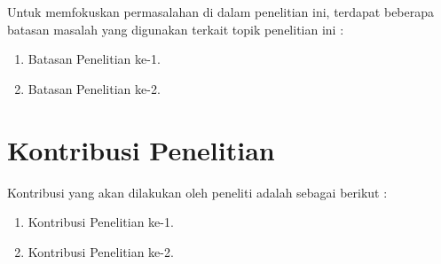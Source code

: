 Untuk memfokuskan permasalahan di dalam penelitian ini, terdapat beberapa batasan masalah yang digunakan terkait topik penelitian ini :

\begin{enumerate}
    \item Batasan Penelitian ke-1.
    \item Batasan Penelitian ke-2.
\end{enumerate}

\section{Kontribusi Penelitian}

Kontribusi yang akan dilakukan oleh peneliti adalah sebagai berikut :

\begin{enumerate}
    \item Kontribusi Penelitian ke-1.
    \item Kontribusi Penelitian ke-2.
\end{enumerate}
